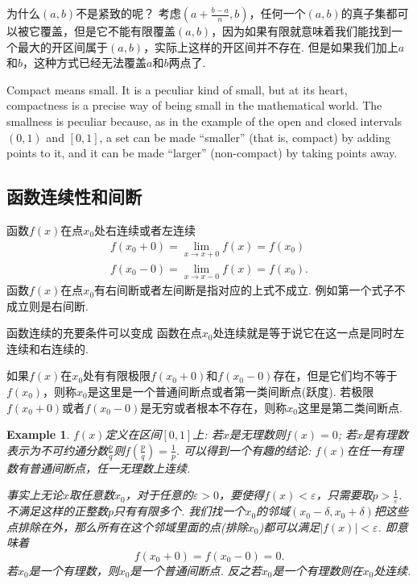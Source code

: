 \documentclass{article}
\newtheorem{example}[theorem]{Example}
\begin{document}

为什么$(a,b)$不是紧致的呢？ 考虑$(a+\frac{b-a}{n},b)$，任何一个$(a,b)$的真子集都可以被它覆盖，但是它不能有限覆盖$(a,b)$，因为如果有限就意味着我们能找到一个最大的开区间属于$(a,b)$，实际上这样的开区间并不存在. 但是如果我们加上$a$和$b$，这种方式已经无法覆盖$a$和$b$两点了.

Compact means small. It is a peculiar kind of small, but at its heart, compactness is a precise way of being small in the mathematical world. The smallness is peculiar because, as in the example of the open and closed intervals $(0,1)$ and $[0,1]$, a set can be made “smaller” (that is, compact) by adding points to it, and it can be made “larger” (non-compact) by taking points away.

\newpage
\subsection{函数连续性和间断}

函数$f(x)$在点$x_0$处右连续或者左连续
\begin{align}
f(x_0+0) = \lim\limits_{x \rightarrow x+0} f(x) = f(x_0) \\
f(x_0-0) = \lim\limits_{x \rightarrow x-0} f(x) = f(x_0).
\end{align}
函数$f(x)$在点$x_0$有右间断或者左间断是指对应的上式不成立. 例如第一个式子不成立则是右间断.

函数连续的充要条件可以变成{\color{blue} 函数在点$x_0$处连续就是等于说它在这一点是同时左连续和右连续的}.

如果$f(x)$在$x_0$处有有限极限$f(x_0+0)$和$f(x_0-0)$存在，但是它们均不等于$f(x_0)$，则称$x_0$是这里是一个普通间断点或者第一类间断点(跃度). 若极限$f(x_0+0)$或者$f(x_0-0)$是无穷或者根本不存在，则称$x_0$这里是第二类间断点.

\begin{example}
$f(x)$定义在区间$[0,1]$上: 若$x$是无理数则$f(x)=0$; 若$x$是有理数表示为不可约通分数$\frac{p}{q}$则$f(\frac{p}{q})=\frac{1}{p}$. 可以得到一个有趣的结论: $f(x)$在任一有理数有普通间断点，任一无理数上连续.

\rm 事实上无论$x$取任意数$x_0$，对于任意的$\varepsilon > 0$，要使得$f(x) < \varepsilon$，只需要取$p > \frac{1}{\varepsilon}$. 不满足这样的正整数$p$只有有限多个. 我们找一个$x_0$的邻域$(x_0-\delta,x_0+\delta)$把这些点排除在外，那么所有在这个邻域里面的点(排除$x_0$)都可以满足$|f(x)| < \varepsilon$. 即意味着
$$
f(x_0 + 0) = f(x_0 - 0) = 0.
$$
若$x_0$是一个有理数，则$x_0$是一个普通间断点. 反之若$x_0$是一个有理数则在$x_0$处连续.
\end{example}
\end{document}
